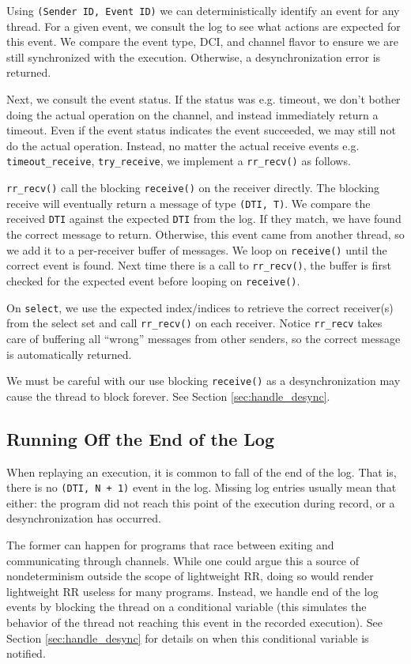 Using \texttt{(Sender ID, Event ID)} we can deterministically identify an event for any thread.
For a given event, we consult the log to see what actions are expected for this event.
We compare the event type, DCI, and channel flavor to ensure we are still
synchronized with the execution. Otherwise, a desynchronization error is returned.

Next, we consult the event status. If the status was e.g. timeout, we don't bother
doing the actual operation on the channel, and instead immediately return a timeout.
Even if the event status indicates the event succeeded, we may still not
do the actual operation. Instead, no matter the actual receive events e.g.
\texttt{timeout\_receive}, \texttt{try\_receive},
we implement a \texttt{rr\_recv()} as follows.

\texttt{rr\_recv()} call the blocking \texttt{receive()} on the receiver directly.
The blocking receive will eventually return a message of type \texttt{(DTI, T)}. We
compare the received \texttt{DTI} against the expected \texttt{DTI} from the log.
If they match,
we have found the correct message to return. Otherwise, this event came from another
thread, so we add it to a per-receiver buffer of messages. We loop on \texttt{receive()}
until the correct event is found. Next time there is a call to \texttt{rr\_recv()},
the buffer is first checked for the expected event before looping on \texttt{receive()}.

On \texttt{select}, we use the expected index/indices to retrieve the correct receiver(s)
from the select set and call \texttt{rr\_recv()} on each receiver. Notice \texttt{rr\_recv}
takes care of buffering all ``wrong'' messages from other senders, so the correct message
is automatically returned.

We must be careful with our use blocking \texttt{receive()} as a desynchronization may
cause the thread to block forever. See Section \ref{sec:handle_desync}.

\subsection{Running Off the End of the Log}
When replaying an execution, it is common to fall of the end of the log. That is,
there is no \texttt{(DTI, N + 1)} event in the log. Missing log entries usually mean
that either: the program did not reach this point of the execution during record, or a desynchronization has occurred.

The former can happen for programs that race between exiting and communicating through
channels. While one could argue this a source of nondeterminism outside the scope of
lightweight RR, doing so would render lightweight RR useless for many programs.
Instead, we handle end of the log events by blocking the thread on a conditional
variable (this simulates the behavior of the thread not reaching this event in the recorded execution). See Section \ref{sec:handle_desync} for details on when this conditional variable
is notified.

